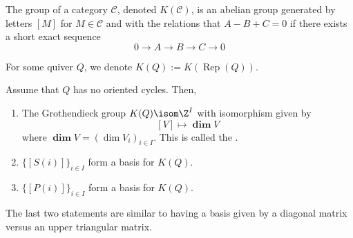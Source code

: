 \documentclass[11pt,leqno,oneside]{amsbook}
\numberwithin{thm}{section}
\newcommand{\Rep}{\operatorname{Rep}} %
\renewcommand{\Q}{Q} %
\newcommand{\grdim}{\boldsymbol{\dim}} %
\begin{document}
\begin{defn}
  The  group of a category \(\mathcal{C}\), denoted
  \(K(\mathcal{C})\), is an abelian group generated by letters \([M]\)
  for \(M \in \mathcal{C}\) and with the relations that \(A-B+C = 0\)
  if there exists a short exact sequence \[
    0 \to A \to B \to C \to 0
  \]
\end{defn}
\begin{defn}
  For some quiver \(\Q\), we denote \(K(\Q) := K(\Rep(\Q))\).
\end{defn}
\begin{prop}
  Assume that \(\Q\) has no oriented cycles. Then,
  \begin{enumerate}
  \item The Grothendieck group \(K(\Q) \isom \Z^{I}\) with isomorphism
    given by \[
      [V] \mapsto \grdim V
    \]
    where \(\grdim V = (\dim V_i)_{i \in I}\). This is called the
    .
  \item \(\{[S(i)]\}_{i \in I}\) form a basis for \(K(Q)\).
  \item \(\{[P(i)]\}_{i \in I}\) form a basis for \(K(Q)\). 
  \end{enumerate}
\end{prop}
The last two statements are similar to having a basis given by a
diagonal matrix versus an upper triangular matrix. \\
\end{document}
